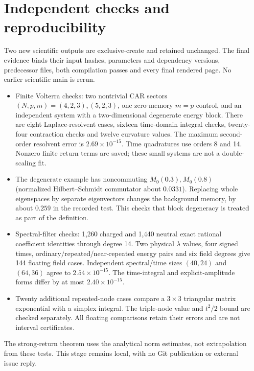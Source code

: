 \documentclass[11pt]{article}
\begin{document}
\section{Independent checks and reproducibility}
Two new scientific outputs are exclusive-create and retained unchanged.
The final evidence binds their input hashes, parameters and dependency
versions, predecessor files, both compilation passes and every final
rendered page. No earlier scientific main is rerun.
\begin{itemize}
\item Finite Volterra checks: two nontrivial CAR sectors
$(N,p,m)=(4,2,3),(5,2,3)$, one zero-memory $m=p$ control, and
an independent system with a two-dimensional degenerate energy block.
There are eight Laplace-resolvent cases, sixteen time-domain integral
checks, twenty-four contraction checks and twelve curvature values.
The maximum second-order resolvent error is $2.69\times10^{-15}$.
Time quadratures use orders 8 and 14. Nonzero finite return terms
are saved; these small systems are not a double-scaling fit.
\item The degenerate example has noncommuting $M_0(0.3),M_0(0.8)$
(normalized Hilbert--Schmidt commutator about $0.0331$).
Replacing whole eigenspaces by separate eigenvectors changes the
background memory, by about $0.259$ in the recorded test.
This checks that block degeneracy is treated as part of the definition.
\item Spectral-filter checks: 1,260 charged and 1,440 neutral exact
rational coefficient identities through degree 14. Two physical
$\lambda$ values, four signed times, ordinary/repeated/near-repeated
energy pairs and six field degrees give 144 floating field cases.
Independent spectral/time sizes $(40,24)$ and $(64,36)$ agree to
$2.54\times10^{-15}$. The time-integral and explicit-amplitude
forms differ by at most $2.40\times10^{-15}$.
\item Twenty additional repeated-node cases compare a $3\times3$
triangular matrix exponential with a simplex integral. The triple-node
value and $t^2/2$ bound are checked separately. All floating comparisons
retain their errors and are not interval certificates.
\end{itemize}
The strong-return theorem uses the analytical norm estimates, not
extrapolation from these tests. This stage remains local, with no Git
publication or external issue reply.
\end{document}
